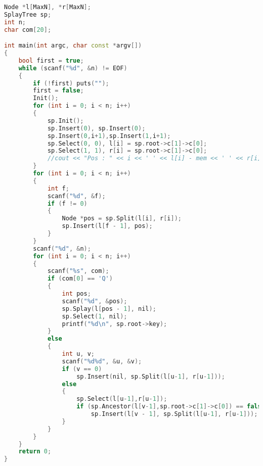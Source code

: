 \begin{lstlisting}[language=c++]
Node *l[MaxN], *r[MaxN];
SplayTree sp;
int n;
char com[20];

int main(int argc, char const *argv[])
{
	bool first = true;
	while (scanf("%d", &n) != EOF)
	{
		if (!first) puts("");
		first = false;
		Init();
		for (int i = 0; i < n; i++)
		{
			sp.Init();
			sp.Insert(0), sp.Insert(0);
			sp.Insert(0,i+1),sp.Insert(1,i+1);
			sp.Select(0, 0), l[i] = sp.root->c[1]->c[0];
			sp.Select(1, 1), r[i] = sp.root->c[1]->c[0];
			//cout << "Pos : " << i << ' ' << l[i] - mem << ' ' << r[i] - mem << endl;
		}
		for (int i = 0; i < n; i++)
		{
			int f;
			scanf("%d", &f);
			if (f != 0)
			{
				Node *pos = sp.Split(l[i], r[i]);
				sp.Insert(l[f - 1], pos);
			}
		}
		scanf("%d", &n);
		for (int i = 0; i < n; i++)
		{
			scanf("%s", com);
			if (com[0] == 'Q')
			{
				int pos;
				scanf("%d", &pos);
				sp.Splay(l[pos - 1], nil);
				sp.Select(1, nil);
				printf("%d\n", sp.root->key);
			}
			else
			{
				int u, v;
				scanf("%d%d", &u, &v);
				if (v == 0)
					sp.Insert(nil, sp.Split(l[u-1], r[u-1]));
				else
				{
					sp.Select(l[u-1],r[u-1]);
					if (sp.Ancestor(l[v-1],sp.root->c[1]->c[0]) == false)
						sp.Insert(l[v - 1], sp.Split(l[u-1], r[u-1]));
				}
			}
		}
	}
	return 0;
}
	\end{lstlisting} 